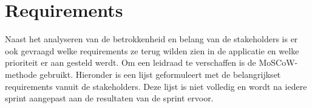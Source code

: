 \section{Requirements}\label{sec:requirements}
Naast het analyseren van de betrokkenheid en belang van de stakeholders is er ook gevraagd welke requirements ze terug wilden zien in de applicatie en welke prioriteit er aan gesteld werdt.
Om een leidraad te verschaffen is de MoSCoW-methode gebruikt.
Hieronder is een lijst geformuleert met de belangrijkset requirements vanuit de stakeholders.
Deze lijst is niet volledig en wordt na iedere sprint aangepast aan de resultaten van de sprint ervoor.
